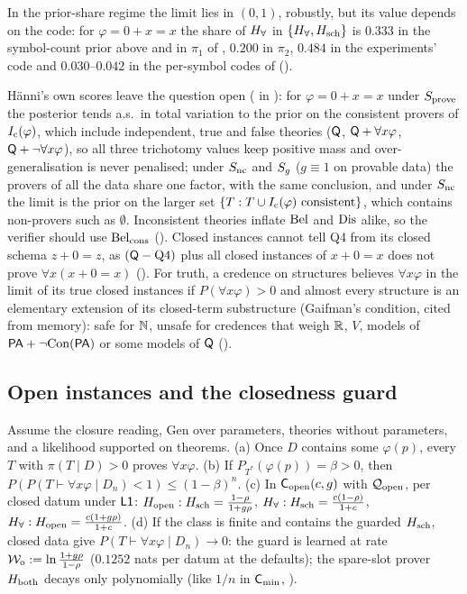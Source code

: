 In the prior-share regime the limit lies in $(0,1)$, robustly, but its value depends on the code: for $\varphi=0+x=x$ the share of $H_{\forall}$ in $\{H_{\forall},H_{\mathrm{sch}}\}$ is $0.333$ in the symbol-count prior above and in $\pi_1$ of , $0.200$ in $\pi_2$, $0.484$ in the experiments' code and $0.030$--$0.042$ in the per-symbol codes of  ().

\noindent H\"anni's own scores leave the question open ( in ): for $\varphi=0+x=x$ under $S_{\mathrm{prove}}$ the posterior tends a.s.\ in total variation to the prior on the consistent provers of $I_{\mathrm{c}}(\varphi)$, which include independent, true and false theories ($\mathsf{Q}$, $\mathsf{Q}+\forall x\varphi$, $\mathsf{Q}+\neg\forall x\varphi$), so all three trichotomy values keep positive mass and over-generalisation is never penalised; under $S_{\mathrm{nc}}$ and $S_{g}$ ($g\equiv1$ on provable data) the provers of all the data share one factor, with the same conclusion, and under $S_{\mathrm{nc}}$ the limit is the prior on the larger set $\{T:T\cup I_{\mathrm{c}}(\varphi)\text{ consistent}\}$, which contains non-provers such as $\emptyset$. Inconsistent theories inflate $\mathrm{Bel}$ and $\mathrm{Dis}$ alike, so the verifier should use $\mathrm{Bel}_{\mathrm{cons}}$ (). Closed instances cannot tell Q4 from its closed schema $z+0=z$, as $(\mathsf{Q}-\text{Q4})$ plus all closed instances of $x+0=x$ does not prove $\forall x(x+0=x)$ (). For truth, a credence on structures believes $\forall x\varphi$ in the limit of its true closed instances if $P(\forall x\varphi)>0$ and almost every structure is an elementary extension of its closed-term substructure (Gaifman's condition, cited from memory): safe for $\mathbb{N}$, unsafe for credences that weigh $\mathbb{R}$, $V$, models of $\mathsf{PA}+\neg\mathrm{Con}(\mathsf{PA})$ or some models of $\mathsf{Q}$ ().

\subsection{Open instances and the closedness guard}\label{sec:univ:open}

\begin{proposition}\label{prop:univ:open}
Assume the closure reading, Gen over parameters, theories without parameters, and a likelihood supported on theorems. \textup{(a)} Once $D$ contains some $\varphi(p)$, every $T$ with $\pi(T\mid D)>0$ proves $\forall x\varphi$. \textup{(b)} If $P_{T^*}(\varphi(p))=\beta>0$, then $P(P(T\vdash\forall x\varphi\mid D_n)<1)\le(1-\beta)^n$. \textup{(c)} In $\mathsf{C}_{\mathrm{open}}(c,g)$ with $\mathcal{Q}_{\mathrm{open}}$, per closed datum under $\mathord{\mathsf{L1}}$: $H_{\mathrm{open}}:H_{\mathrm{sch}}=\frac{1-\rho}{1+g\rho}$, $H_{\forall}:H_{\mathrm{sch}}=\frac{c(1-\rho)}{1+c}$, $H_{\forall}:H_{\mathrm{open}}=\frac{c(1+g\rho)}{1+c}$. \textup{(d)} If the class is finite and contains the guarded $H_{\mathrm{sch}}$, closed data give $P(T\vdash\forall x\varphi\mid D_n)\to0$: the guard is learned at rate $\mathcal{W}_{\mathrm{o}}:=\ln\frac{1+g\rho}{1-\rho}$ ($0.1252$ nats per datum at the defaults); the spare-slot prover $H_{\mathrm{both}}$ decays only polynomially (like $1/n$ in $\mathsf{C}_{\min}$, ).
\end{proposition}

